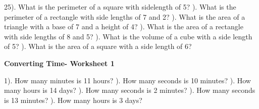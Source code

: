 \documentclass{article}%
\begin{document}
25). What is the perimeter of a square with sidelength of 5?%
\newline%
\newline%
). What is the perimeter of a rectangle with side lengths of 7 and 2?%
\newline%
\newline%
). What is the area of a triangle with a base of 7 and a height of 4?%
\newline%
\newline%
). What is the area of a rectangle with side lengths of 8 and 5?%
\newline%
\newline%
). What is the volume of a cube with a side length of 5?%
\newline%
\newline%
). What is the area of a square with a side length of 6?%
\newline%
\newline%
\newline%
\pagebreak%
\large%
\begin{center}%
\textbf{Converting Time- Worksheet 1}%
\newline%
\newline%
\newline%
\end{center} \normalsize%
1). How many minutes is 11 hours?%
\newline%
\newline%
). How many seconds is 10 minutes?%
\newline%
\newline%
). How many hours is 14 days?%
\newline%
\newline%
). How many seconds is 2 minutes?%
\newline%
\newline%
). How many seconds is 13 minutes?%
\newline%
\newline%
). How many hours is 3 days?%
\newline%
\end{document}
